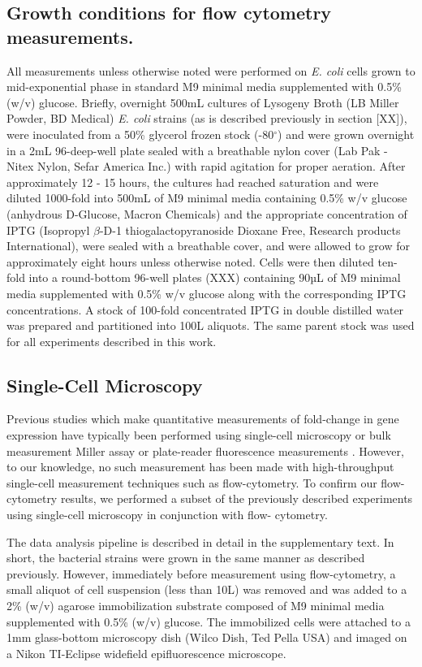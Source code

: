 \subsection*{Growth conditions for flow cytometry measurements.}
All measurements unless otherwise noted were performed on \textit{E. coli} cells
grown to mid-exponential phase in standard M9 minimal media supplemented with
0.5\% (w/v) glucose. Briefly, overnight 500mL cultures of Lysogeny Broth (LB
Miller Powder, BD Medical) \textit{E. coli} strains (as is described previously
in section [XX]), were inoculated from a 50\% glycerol frozen stock
(-80$^\circ$) and were grown overnight in a 2mL 96-deep-well plate sealed with
a breathable nylon cover (Lab Pak - Nitex Nylon, Sefar America Inc.) with
rapid agitation for proper aeration. After approximately 12 - 15 hours, the
cultures had reached saturation and were diluted 1000-fold into 500mL of M9
minimal media containing 0.5\% w/v glucose (anhydrous D-Glucose, Macron
Chemicals) and the appropriate concentration of IPTG (Isopropyl $\beta$-D-1
thiogalactopyranoside Dioxane Free, Research products International), were
sealed with a breathable cover, and were allowed to grow for approximately
eight hours unless otherwise noted. Cells were then diluted ten-fold into a
round-bottom 96-well plates (XXX) containing 90µL of M9 minimal media
supplemented with 0.5\% w/v glucose along with the corresponding IPTG
concentrations. A stock of 100-fold concentrated IPTG in double distilled water
was prepared and partitioned into 100\textmu L aliquots. The same parent stock
was used for all experiments described in this work.

\subsection*{Single-Cell Microscopy}
Previous studies which make quantitative measurements of fold-change in
gene expression have typically been performed using single-cell microscopy
\cite{Brewster2014, Jones2014} or bulk measurement
Miller assay or plate-reader fluorescence measurements \cite{Garcia2011,
Razo-Mejia2014}. However, to our knowledge, no such measurement has been made
with high-throughput single-cell  measurement techniques such as flow-cytometry.
To confirm our flow-cytometry results, we performed a subset of the previously
described experiments using  single-cell microscopy in conjunction with flow-
cytometry.

The data analysis pipeline is described in detail in the supplementary text. In
short, the bacterial strains were grown in the same manner as described
previously. However, immediately before measurement using flow-cytometry, a
small aliquot of cell suspension (less than 10\textmu L) was removed and was
added to a 2\% (w/v) agarose immobilization substrate composed of M9 minimal
media supplemented with 0.5\% (w/v) glucose. The immobilized cells were
attached to a 1mm glass-bottom microscopy dish (Wilco Dish, Ted Pella USA) and
imaged on a Nikon TI-Eclipse widefield epifluorescence microscope.

